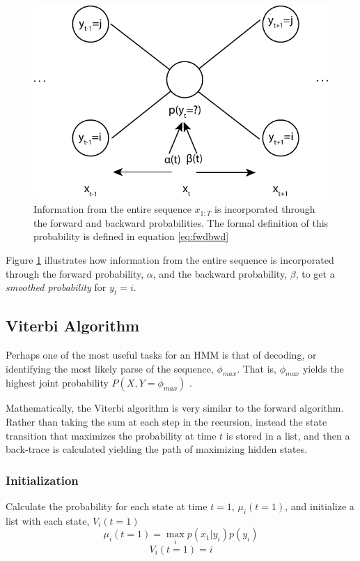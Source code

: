 \begin{figure}[t]
\centering
\includegraphics[width=.75\textwidth]{images/fwdbwd.pdf}
\caption[Forward-backward smoothed probability]{Information from the entire sequence $x_{1:T}$ is incorporated through the forward and backward probabilities. The formal definition of this probability is defined in equation \ref{eq:fwdbwd}}
\label{fig:fwdbwd}
\end{figure}

Figure \ref{fig:fwdbwd} illustrates how information from the entire sequence is incorporated through the forward probability, $\alpha$, and the backward probability, $\beta$, to get a \emph{smoothed probability} for $y_t = i$.

\subsection{Viterbi Algorithm}
Perhaps one of the most useful tasks for an HMM is that of decoding, or identifying the most likely parse of the sequence, $\phi_{max}$. That is, $\phi_{max}$ yields the highest joint probability $P(X,Y=\phi_{max})$ \cite{Rabiner1989ARecognition}. 

Mathematically, the Viterbi algorithm is very similar to the forward algorithm. Rather than taking the sum at each step in the recursion, instead the state transition that maximizes the probability at time $t$ is stored in a list, and then a back-trace is calculated yielding the path of maximizing hidden states.

\subsubsection{Initialization}
Calculate the probability for each state at time $t=1$, $\mu_i(t=1)$, and initialize a list with each state, $V_i(t=1)$
\begin{equation}
    \mu_i(t=1) = \max_i p(x_1|y_i)p(y_i)
\label{eq:fwdinit}
\end{equation}
$$    V_i(t=1) = i$$
